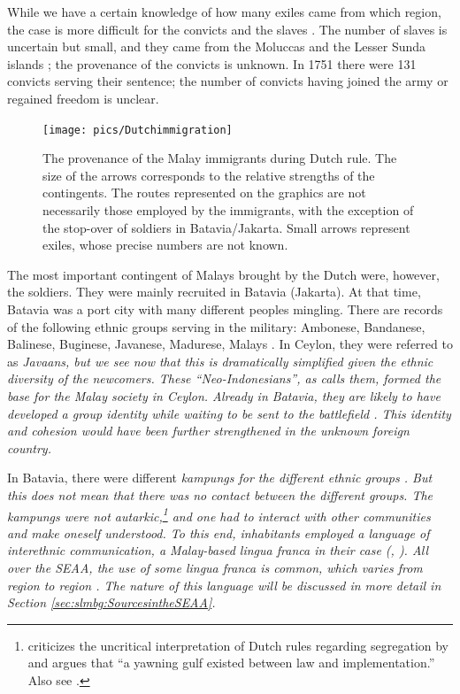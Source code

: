 While we have a certain knowledge of how many exiles came from which region, the case is more difficult for the convicts and the slaves \citep[47]{Hussainmiya1987}. The number of slaves is uncertain but small, and they came from the Moluccas and the Lesser Sunda islands \citep[48]{Hussainmiya1990}; the provenance of the convicts is unknown. In 1751 there were 131 convicts serving their sentence; the number of convicts having joined the army or regained freedom is unclear.


\begin{figure}
 \centering
\texttt{[image: pics/Dutchimmigration]} 
 \caption[Provenance of Malay immigrants during Dutch rule]{The provenance of the Malay immigrants during Dutch rule. The size of the arrows corresponds to the relative strengths of the contingents. The routes represented on the graphics are not necessarily those employed by the immigrants, with the exception of the stop-over of soldiers   in Batavia/Jakarta.  Small arrows represent exiles, whose precise numbers are not known.}
\label{fig:ImmigrationDutch}
\end{figure}

 
The most important contingent of Malays brought by the Dutch were, however, the  soldiers.  They were mainly recruited in Batavia (Jakarta). At that time, Batavia was a port city with many different peoples mingling.  There are records of the following ethnic groups serving in the military: Ambonese, Bandanese, Balinese, Buginese, Javanese, Madurese, Malays \citep{Bichsel,Raben2000}.  In Ceylon, they were referred to as \em  Javaans\em, but we see now that this is dramatically simplified given the ethnic diversity of the newcomers. These ``Neo-Indonesians'', as \citet[57]{Hussainmiya1987} calls them, formed the base for the Malay society in Ceylon.  Already in Batavia, they are likely to have developed a group identity while waiting to be sent to the battlefield  \citep[174]{Vlekke1943}. This identity and cohesion would have been further strengthened  in the unknown foreign country.

In Batavia, there were different \em kampungs \em for the different ethnic groups \citep[451ff]{DeHaan1935}. %
But this does not mean that there was no contact between the different groups. The \em kampungs \em were not autarkic,\footnote{\citet[97]{Raben2000} criticizes the uncritical interpretation of Dutch rules regarding segregation by \citet{DeHaan1935} and argues that ``a yawning gulf existed between law and implementation.'' Also see \citet[31]{Abeyasekere1987}.} and one had to interact with other communities and make oneself understood. To this end, inhabitants employed a language of interethnic communication, a Malay-based lingua franca in their case (\citet[470]{DeHaan1935}, \citet[102]{Raben2000}). All over the SEAA, the use of some lingua franca is common, which varies from region to region \citep{AdelaarEtAl1996}. The nature of this language will be discussed in more detail in Section \ref{sec:slmbg:SourcesintheSEAA}.


